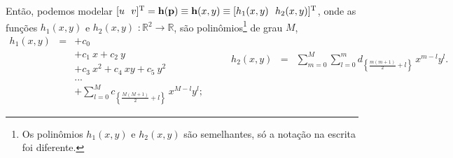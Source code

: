 \begin{theorem}
Então, podemos modelar  
$[u~~v]^{\transpose} = \VECTOR{h}(\VECTOR{p})\equiv \VECTOR{h}(x,y)\equiv [h_1(x,y)~~h_2(x,y) ]^{\transpose}$, 
onde as funções $h_1(x,y)$ e $h_2(x,y)$ $: \mathbb{R}^2 \rightarrow \mathbb{R}$,
são polinômios\footnote{Os polinômios $h_1(x,y)$ e $h_2(x,y)$ são semelhantes, só a notação na escrita foi diferente.} de grau $M$,
\begin{equation}\label{eq:mapeamento:2}
\begin{matrix}
h_1(x,y) & = & +c_{0}\\
              ~ & ~ & +c_{1}~x + c_{2}~y\\
              ~ & ~ & +c_{3}~x^2 +c_{4}~xy + c_{5}~y^2\\
              ~ & ~ &  ...\\
              ~ & ~ & +\sum \limits_{l=0}^{M}c_{\left\{ \frac{M(M+1)}{2}+l\right\}}~x^{M-l}y^{l};
\end{matrix} 
\qquad
\begin{matrix}
h_2(x,y) & = & \sum \limits_{m=0}^{M} \sum \limits_{l=0}^{m}d_{\left\{ \frac{m(m+1)}{2}+l\right\}}~x^{m-l}y^{l}.
       ~ & ~ & ~\\
       ~ & ~ & ~\\
       ~ & ~ & ~\\
       ~ & ~ & ~\\
       ~ & ~ & ~
\end{matrix}
\end{equation}


\end{theorem}
